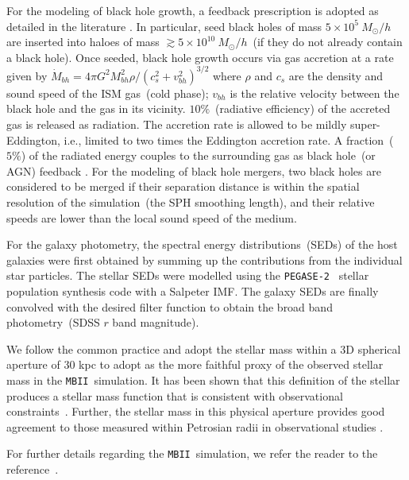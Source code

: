 \documentclass{natureprintstyle}
\newcommand{\mbii}{\texttt{MBII}}
\begin{document}
For the modeling of black hole growth, a feedback prescription is adopted as detailed in the literature \cite{2005Natur.433..604D, 2005MNRAS.361..776S}. In particular, seed black holes of mass $5\times 10^{5}~M_{\odot}/h$ are inserted into haloes of mass $\gtrsim 5\times 10^{10}~M_{\odot}/h$~(if they do not already contain a black hole). Once seeded, black hole growth occurs via gas accretion at a rate given by $\dot{M}_{bh}={4\pi G^2 M_{bh}^2 \rho}/{(c_s^2+v_{bh}^2)^{3/2}}$ where $\rho$ and $c_s$ are the density and sound speed of the ISM gas~(cold phase); $v_{bh}$ is the relative velocity between the black hole and the gas in its vicinity. $10\%$~(radiative efficiency) of the accreted gas is released as radiation. The accretion rate is allowed to be mildly super-Eddington, i.e., limited to two times the Eddington accretion rate. A fraction~($5\%$) of the radiated energy couples to the surrounding gas as black hole~(or AGN) feedback \cite{2005Natur.433..604D}. For the modeling of black hole mergers, two black holes are considered to be merged if their separation distance is within the spatial resolution of the simulation~(the SPH smoothing length), and their relative speeds are lower than the local sound speed of the medium.

For the galaxy photometry, the spectral energy distributions~(SEDs) of the host galaxies were first obtained by summing up the contributions from the individual star particles. The stellar SEDs were modelled using the \texttt{PEGASE-2}~\cite{1999astro.ph.12179F} stellar population synthesis code with a Salpeter IMF. The galaxy SEDs are finally convolved with the desired filter function to obtain the broad band photometry~(SDSS $r$ band magnitude). 

We follow the common practice and adopt the stellar mass within a 3D spherical aperture of 30 kpc to adopt as the more faithful proxy of the observed stellar mass in the \mbii\ simulation. It has been shown that this definition of the stellar produces a stellar mass function that is consistent with observational constraints~\cite{Pillepich2018}. Further, the stellar mass in this physical aperture provides good agreement to those measured within Petrosian radii in observational studies \cite{Schaye2015}.


For further details regarding the \mbii\ simulation, we refer the reader to the reference~\cite{2015MNRAS.450.1349K}.
\end{document}
